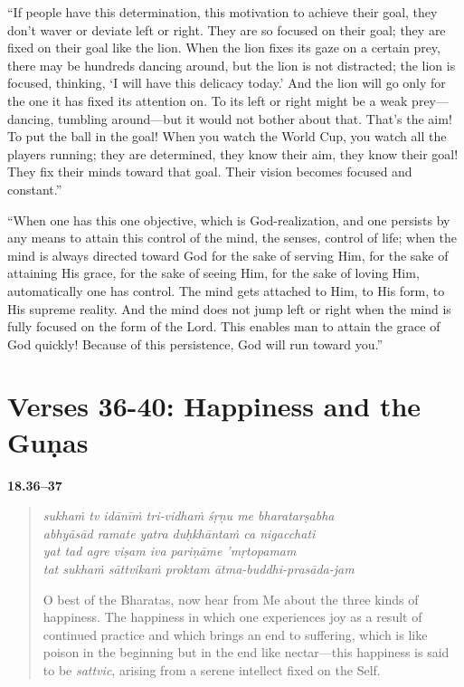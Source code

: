 \enquote{If people have this determination, this motivation to achieve their goal, they don’t waver or deviate left or right. They are so focused on their goal; they are fixed on their goal like the lion. When the lion fixes its gaze on a certain prey, there may be hundreds dancing around, but the lion is not distracted; the lion is focused, thinking, \enquote{I will have this delicacy today.} And the lion will go only for the one it has fixed its attention on. To its left or right might be a weak prey---dancing, tumbling around---but it would not bother about that. That’s the aim! To put the ball in the goal! When you watch the World Cup, you watch all the players running; they are determined, they know their aim, they know their goal! They fix their minds toward that goal. Their vision becomes focused and constant.}

\enquote{When one has this one objective, which is God-realization, and one persists by any means to attain this control of the mind, the senses, control of life; when the mind is always directed toward God for the sake of serving Him, for the sake of attaining His grace, for the sake of seeing Him, for the sake of loving Him, automatically one has control. The mind gets attached to Him, to His form, to His supreme reality. And the mind does not jump left or right when the mind is fully focused on the form of the Lord. This enables man to attain the grace of God quickly! Because of this persistence, God will run toward you.}

\newpage
\section{Verses 36-40: Happiness and the Guṇas}\label{sec-verses-36-40-happiness-and-the-gunas}


\par\noindent\textbf{18.36–37}\par
\begin{verse}
\textit{sukhaṁ tv idānīṁ tri-vidhaṁ śṛṇu me bharatarṣabha} \\
\textit{abhyāsād ramate yatra duḥkhāntaṁ ca nigacchati} \\
\textit{yat tad agre viṣam iva pariṇāme ’mṛtopamam} \\
\textit{tat sukhaṁ sāttvikaṁ proktam ātma-buddhi-prasāda-jam}

\noindent O best of the Bharatas, now hear from Me about the three kinds of happiness. The happiness in which one experiences joy as a result of continued practice and which brings an end to suffering, which is like poison in the beginning but in the end like nectar---this happiness is said to be \textit{sattvic}, arising from a serene intellect fixed on the Self.
\end{verse}
\par



